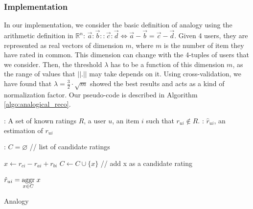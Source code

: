 \subsubsection{Implementation}

In our implementation, we consider the basic definition of analogy using the
arithmetic definition in $\mathbb{R}^n$: $\vec{a}:\vec{b}::\vec{c}:\vec{d}
\iff \vec{a}-\vec{b}=\vec{c}-\vec{d}$.
Given 4 users, they are represented as real vectors of dimension $m$, where $m$
is the number of item they have rated in common. This dimension can
change with the 4-tuples of users that we consider.
Then, the threshold $\lambda$ has to be a function of this dimension $m$,
as the range of values that $||.||$ may take depends on it. Using
cross-validation, we have found that $\lambda = \frac{3}{2} \cdot\sqrt{m}$ showed the
best results and acts as a kind of normalization factor.
Our pseudo-code is described in
Algorithm \ref{algo:analogical_reco}.
 \begin{algorithm}[!ht]
       \begin{algorithmic}

      : A set of known ratings $R$, a user $u$, an item
      $i$ such that $r_{ui} \notin R$.
      : $\hat{r}_{ui}$, an estimation of $r_{ui}$

      :
      \STATE $C = \varnothing$ \quad \quad // list of candidate ratings

      \STATE  $x \leftarrow r_{ci} - r_{ai} + r_{bi}$
      \STATE $C \gets C \cup \{x\}$ \quad // add x as a candidate rating
	  \ENDFOR

    \STATE $\hat{r}_{ui} = \underset{x \in C}{\operatorname{aggr}}\; x$

\end{algorithmic}
     \caption{Analogy}
       \label{algo:analogical_reco}
\end{algorithm}

